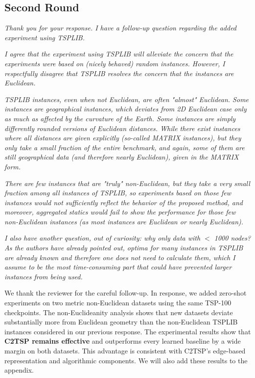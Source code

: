 \subsection{Second Round}
\textit{Thank you for your response. I have a follow-up question regarding the added experiment using TSPLIB.}

\textit{I agree that the experiment using TSPLIB will alleviate the concern that the experiments were based on (nicely behaved) random instances. However, I respectfully disagree that TSPLIB resolves the concern that the instances are Euclidean.}

\textit{TSPLIB instances, even when not Euclidean, are often "almost" Euclidean. Some instances are geographical instances, which deviates from 2D Euclidean case only as much as affected by the curvature of the Earth. Some instances are simply differently rounded versions of Euclidean distances. While there exist instances where all distances are given explicitly (so-called MATRIX instances), but they only take a small fraction of the entire benchmark, and again, some of them are still geographical data (and therefore nearly Euclidean), given in the MATRIX form.}

\textit{There are few instances that are "truly" non-Euclidean, but they take a very small fraction among all instances of TSPLIB, so experiments based on those few instances would not sufficiently reflect the behavior of the proposed method, and moreover, aggregated statics would fail to show the performance for those few non-Euclidean instances (as most instances are Euclidean or nearly Euclidean).}

\textit{I also have another question, out of curiosity: why only data with $<$ 1000 nodes? As the authors have already pointed out, optima for many instances in TSPLIB are already known and therefore one does not need to calculate them, which I assume to be the most time-consuming part that could have prevented larger instances from being used.}

We thank the reviewer for the careful follow-up. In response, we added zero-shot experiments on two metric non-Euclidean datasets using the same TSP-100 checkpoints. The non-Euclideanity analysis shows that new datasets deviate substantially more from Euclidean geometry than the non-Euclidean TSPLIB instances considered in our previous response. 
The experimental results show that \textbf{C2TSP remains effective} and outperforms every learned baseline by a wide margin on both datasets. This advantage is consistent with C2TSP's edge-based representation and algorithmic components. We will also add these results to the appendix.


